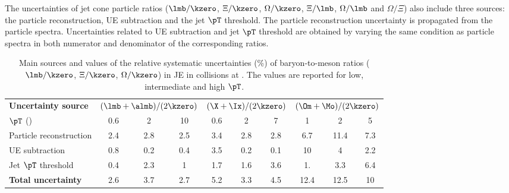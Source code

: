 \documentclass[ALICE,manyauthors]{cernphprep}
\begin{document}
The uncertainties of jet cone particle ratios ($\lmb/\kzero$, $\Xi/\kzero$, $\Omega/\kzero$, $\Xi/\lmb$, $\Omega/\lmb$ and $\Omega/\Xi$) also include three sources: the particle reconstruction, UE subtraction and the jet $\pT$ threshold.
The particle reconstruction uncertainty is propagated from the particle spectra.
Uncertainties related to UE subtraction and jet $\pT$ threshold are obtained by varying the same condition as particle spectra in both numerator and denominator of the corresponding ratios.

\begin{table}[!ht]
	\begin{center}
		\caption{Main sources and values of the relative systematic uncertainties (\%) of baryon-to-meson ratios ($\lmb/\kzero$, $\Xi/\kzero$, $\Omega/\kzero$) in JE in \pp collisions at \thirteen.
			The values are reported for low, intermediate and high $\pT$.}
		\label{tab:ppBMRatioUncer}
		\begin{tabularx}{\textwidth}{@{} lCCCCCCCCC @{}}
			\toprule
			\textbf{Uncertainty source} & 
			& 
			&  \\
			\cmidrule(lr){2-4} \cmidrule(lr){5-7} \cmidrule(lr){8-10}
			$\pT$ (\GeVc) & 0.6 & 2 &10  & 0.6 & 2 & 7 & 1 & 2 & 5 \\
			\midrule
			Particle reconstruction& 2.4& 2.8& 2.5& 3.4& 2.8& 2.8& 6.7& 11.4& 7.3\\
			UE subtraction& 0.8& 0.2& 0.4& 3.5& 0.2& 0.1& 10& 4& 2.2\\
			Jet $\pT$ threshold& 0.4& 2.3& 1& 1.7& 1.6& 3.6& 1.& 3.3& 6.4\\
			\midrule
			\textbf{Total uncertainty}& 2.6& 3.7& 2.7& 5.2& 3.3& 4.5& 12.4& 12.5& 10\\
			\bottomrule
		\end{tabularx}
	\end{center}
\end{table}
\end{document}
